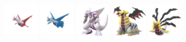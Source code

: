 \documentclass[12pt]{beamer}
\begin{document}
\begin{frame}[label=Fairy]
\begin{footnotesize}
\begin{block}{}
\begin{center}
    \includegraphics[width=1.5cm]{../../images/pokemon/latias.png}
    \includegraphics[width=1.5cm]{../../images/pokemon/latios.png}
    \includegraphics[width=1.5cm]{../../images/pokemon/palkia.png}\quad
    \includegraphics[width=1.5cm]{../../images/pokemon/giratina_a.png}\quad
    \includegraphics[width=1.5cm]{../../images/pokemon/giratina_o.png}
\end{center}
\end{block}

\end{footnotesize}
\end{frame}



\end{document}
